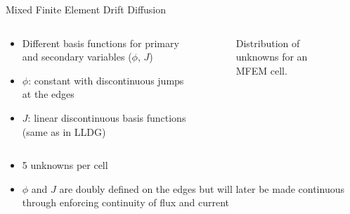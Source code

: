 \documentclass[10pt]{beamer}
\begin{document}
\begin{frame}{Mixed Finite Element Drift Diffusion}

	\begin{columns}
	\begin{column}{.5\textwidth}

		\begin{itemize}

			\item Different basis functions for primary and secondary variables ($\phi$, $J$)

			\item $\phi$: constant with discontinuous jumps at the edges 

			\item $J$: linear discontinuous basis functions (same as in LLDG) 

		\end{itemize}
		
	\end{column}
	\begin{column}{.5\textwidth}

		\begin{figure}

			\def\svgwidth{\textwidth}
			
			\caption{Distribution of unknowns for an MFEM cell. }

		\end{figure}

	\end{column}

	\end{columns}

	\vspace{-.2in}
	\begin{columns}
	\begin{column}{1.06\textwidth}

		\begin{itemize}

			\item 5 unknowns per cell 

			\item $\phi$ and $J$ are doubly defined on the edges but will later be made continuous through enforcing continuity of flux and current 

		\end{itemize}

	\end{column}
	\end{columns}

\end{frame}
\end{document}
